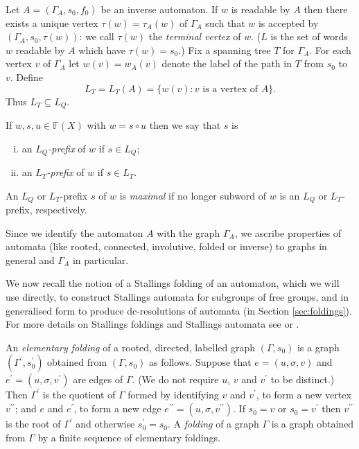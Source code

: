 \documentclass[a4paper,12pt]{article}
\newcommand{\G}{\Gamma }
\newcommand{\s}{\sigma }
\renewcommand{\t}{\tau }
\numberwithin{equation}{section}
\numberwithin{figure}{section}
\newcommand{\FF}{\ensuremath{\mathbb{F}}}
\newcommand{\be}{\begin{enumerate}}
\newcommand{\ee}{\end{enumerate}}
\begin{document}
Let $A=(\G_A,s_0,f_0)$ be an inverse automaton.
If $w$ is readable by $A$ then there exists a
unique vertex  $\t(w)=\t_A(w)$ of $\G_A$ such that $w$ is accepted by
$(\G_A,s_0,\t(w))$: we call $\t(w)$ the {\em terminal vertex} of $w$. ($L$ is the set of words $w$ readable by $A$ which have 
$\t(w)=s_0$.)
Fix a spanning tree $T$ for $\G_A$. For each vertex $v$ of $\G_A$
let $w(v)=w_A(v)$ denote the label of the path in
$T$ from $s_0$ to $v$.  Define
\[L_T=L_T(A)=\{w(v): v \textrm{ is a vertex of } A\}.\]
Thus $L_T\subseteq L_Q$.

If $w, s, u\in \FF(X)$ with $w=s\circ u$ then we say that $s$ is
\be[(i)]
\item
 an $L_Q${\em -prefix} of $w$ if $s\in L_Q$;
\item
an %
$L_T${\em -prefix} of $w$ if $s\in L_T$.
\ee
An $L_Q$ or $L_T$-prefix $s$ of $w$ is  {\em maximal} if no longer
subword of $w$ is an $L_Q$ or $L_T$-prefix, respectively.

Since we identify the automaton $A$ with the graph $\G_A$, we
ascribe properties of automata (like rooted, connected,
involutive, folded or inverse) to graphs in general and $\G_A$ in
particular.

We now recall the notion of a Stallings folding of an automaton,
which we will use directly, to construct Stallings automata for
subgroups of free groups, and in generalised form to produce
dc-resolutions of automata (in Section \ref{sec:foldings}). For
more details on Stallings foldings  and  Stallings automata  see
\cite{ventura11} or \cite{BartholdiSilva}.

An {\em elementary folding} of a rooted, directed, labelled
graph $(\G,s_0)$ is a
graph $(\G^\prime,s^\prime_0)$ obtained from $(\G,s_0)$ as
follows. Suppose that $e=(u, \s, v)$ and $e^\prime=(u, \s,
v^\prime)$ are edges of $\G$. (We do not require $u$, $v$ and
$v^\prime$ to be distinct.)
 Then $\G^\prime$ is the quotient of $\G$ formed by identifying
$v$ and $v^\prime$, to form a new vertex $v^{\prime\prime}$; and
$e$ and $e^\prime$, to form a new edge $e^{\prime\prime}=(u, \s,
v^{\prime\prime})$. If $s_0= v$ or $s_0 = v^\prime$ then
$v^{\prime\prime}$ is the root of $\G^\prime$ and otherwise
$s^\prime_0=s_0$.
 A {\em folding} of a graph $\G$ is a graph obtained
from $\G$ by a finite sequence of elementary foldings.
\end{document}
